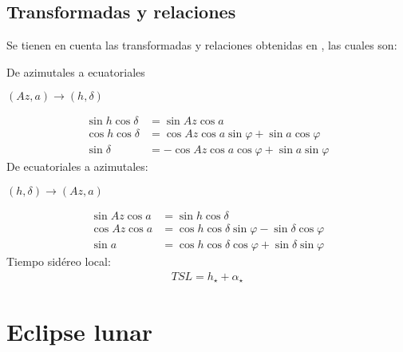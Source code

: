 





\begin{multicols}{2}

\subsection*{\textbf{Transformadas y relaciones}}


Se tienen en cuenta las transformadas y relaciones obtenidas en \cite{R1}, las cuales son:
   
De azimutales a ecuatoriales
\begin{center}
   $(Az, a) \rightarrow  (h, \delta)$
\end{center}
\begin{align}
   \sin h \cos \delta & = \sin Az \cos a \label{eq:sinh} \\ 
   \cos h \cos \delta & =\cos Az \cos a \sin \varphi + \sin a \cos \varphi \label{eq:cosh} \\ 
   \sin \delta & =-\cos Az \cos a \cos \varphi + \sin a \sin \varphi \label{eq:sind}
\end{align}
De ecuatoriales a azimutales:
\begin{center}
   $(h, \delta) \rightarrow (Az, a) $
\end{center}
\begin{align}
   \sin Az \cos a & = \sin h \cos \delta \label{eq:sinaz}\\ 
   \cos Az \cos a & =\cos h \cos \delta \sin \varphi - \sin \delta \cos \varphi \label{eq:cosaz} \\ 
   \sin a & = \cos h \cos \delta \cos \varphi + \sin \delta \sin \varphi \label{eq:sina}
\end{align}
Tiempo sidéreo local:
\begin{align}
   TSL = h_{\star} + \alpha_{\star}
\label{eq:tsl}
\end{align}
   
\section{Eclipse lunar}
   

\end{multicols}
